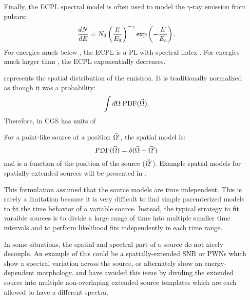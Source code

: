 Finally, the \ac{ECPL} spectral model is often
used to model the $\gamma$-ray emission from pulsars:
\begin{equation}
  \frac{dN}{dE} = N_0 \left(\frac{E}{E_0}\right)^{-\gamma}
  \exp\left(-\frac{E}{E_c}\right).
\end{equation}
For energies much below \Ecutoff, 
the \ac{ECPL} is a \ac{PL} with spectral index \spectralindex.
For energies much larger than \Ecutoff, the \ac{ECPL}
exponentially decreases.

\pdf represents the spatial distribution of the emisison.
It is traditionally normalized as though it was a probability:
  \begin{equation}
    \int d\Omega \; \text{PDF}(\vec\Omega).
  \end{equation}
Therefore, in \ac{CGS} \pdf has units of \pdfunits

For a point-like source at a position $\vec\Omega'$, the spatial model is:
  \begin{equation}
    \text{PDF}(\vec\Omega) = \delta(\vec\Omega - \vec\Omega')
  \end{equation}
and is a function of the position of the source ($\vec\Omega'$).
Example spatial models for spatially-extended sources will be presented
in .

This formulation assumed that the source models are time independent.
This is rarely a limitation because it is very difficult to find
simple paremterized models to fit the time behavior of a variable
source. Instead, the typical strategy to fit varaible sources is to
divide a large range of time into multiple smaller time intervals and
to perform likelihood fits independently in each time range.

In some situations, the spatial and spectral part of a
source do not nicely decouple.  An example of this could be a
spatially-extended \acs{SNR} or \acp{PWN} which show a spectral
variation across the source, or alternately show an energy-dependent
morphology.  \cite{katsuta_2012_fermi-lat-observation} and
\cite{hewitt_2012_fermi-lat-observations} have avoided this issue by
dividing the extended source into multiple non-overlaping extended source
templates which are each allowed to have a different spectra.
